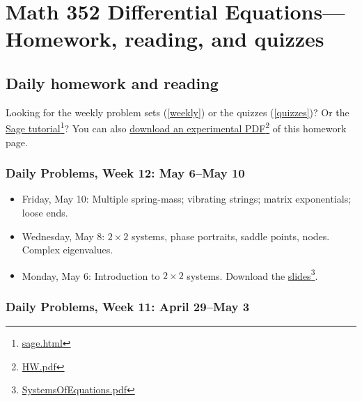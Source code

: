 \def\encoding{UTF-8}

\def\mytitle{Homework and Quiz Schedule}
\def\myauthor{Math 352 Differential Equations}
\def\htmlheaderlevel{1}
\def\latexmode{article}

\chapter{Math 352 Differential Equations---Homework, reading, and quizzes}
\label{math352differentialequationsbr-------homeworkreadingandquizzes}

\section{Daily homework and reading}
\label{daily}

Looking for the weekly problem sets (\autoref{weekly}) or the quizzes (\autoref{quizzes})? Or the \href{sage.html}{Sage tutorial}\footnote{\href{sage.html}{sage.html}}? You can also \href{HW.pdf}{download an experimental PDF}\footnote{\href{HW.pdf}{HW.pdf}} of this homework page.

\subsection{Daily Problems, Week 12: May 6--May 10}
\label{dailyproblemsweek12:may6--may10}

\begin{itemize}
\item Friday, May 10: Multiple spring-mass; vibrating strings; matrix exponentials; loose ends.

\item Wednesday, May 8: $2 \times 2$ systems, phase portraits, saddle points, nodes. Complex eigenvalues.

\item Monday, May 6: Introduction to $ 2 \times 2 $ systems. Download the \href{SystemsOfEquations.pdf}{slides}\footnote{\href{SystemsOfEquations.pdf}{SystemsOfEquations.pdf}}.

\end{itemize}

\subsection{Daily Problems, Week 11: April 29--May 3}
\label{dailyproblemsweek11:april29--may3}

